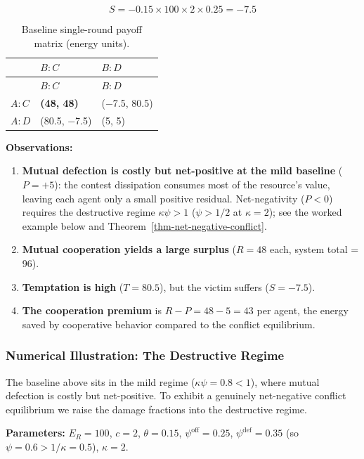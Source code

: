 \documentclass[11pt]{article}
\theoremstyle{plain}
\theoremstyle{definition}
\theoremstyle{remark}
\let\origsubsubsection\subsubsection
\renewcommand{\subsubsection}{\needspace{4\baselineskip}\origsubsubsection}
\providecommand{\tightlist}{%
  \setlength{\itemsep}{0pt}\setlength{\parskip}{0pt}}
\begin{document}
\[S = -0.15 \times 100 \times 2 \times 0.25 = -7.5\]

\begin{longtable}[]{@{}lll@{}}
\caption{Baseline single-round payoff matrix (energy
units).}\tabularnewline
\toprule\noalign{}
& \(B: C\) & \(B: D\) \\
\midrule\noalign{}
\endfirsthead
\toprule\noalign{}
& \(B: C\) & \(B: D\) \\
\midrule\noalign{}
\endhead
\bottomrule\noalign{}
\endlastfoot
\(A: C\) & \textbf{(48, 48)} & (−7.5, 80.5) \\
\(A: D\) & (80.5, −7.5) & (5, 5) \\
\end{longtable}

\textbf{Observations:}

\begin{enumerate}
\def\labelenumi{\arabic{enumi}.}
\tightlist
\item
  \textbf{Mutual defection is costly but net-positive at the mild
  baseline} (\(P = +5\)): the contest dissipation consumes most of the
  resource's value, leaving each agent only a small positive residual.
  Net-negativity (\(P < 0\)) requires the destructive regime
  \(\kappa\psi > 1\) (\(\psi > 1/2\) at \(\kappa = 2\)); see the worked
  example below and Theorem~\ref{thm-net-negative-conflict}.
\item
  \textbf{Mutual cooperation yields a large surplus} (\(R = 48\) each,
  system total = 96).
\item
  \textbf{Temptation is high} (\(T = 80.5\)), but the victim suffers
  (\(S = -7.5\)).
\item
  \textbf{The cooperation premium} is \(R - P = 48 - 5 = 43\) per agent,
  the energy saved by cooperative behavior compared to the conflict
  equilibrium.
\end{enumerate}

\subsubsection{Numerical Illustration: The Destructive
Regime}\label{numerical-illustration-the-destructive-regime}

The baseline above sits in the mild regime (\(\kappa\psi = 0.8 < 1\)),
where mutual defection is costly but net-positive. To exhibit a
genuinely net-negative conflict equilibrium we raise the damage
fractions into the destructive regime.

\textbf{Parameters:} \(E_R = 100\), \(c = 2\), \(\theta = 0.15\),
\(\psi^{\text{off}} = 0.25\), \(\psi^{\text{def}} = 0.35\) (so
\(\psi = 0.6 > 1/\kappa = 0.5\)), \(\kappa = 2\).
\end{document}
